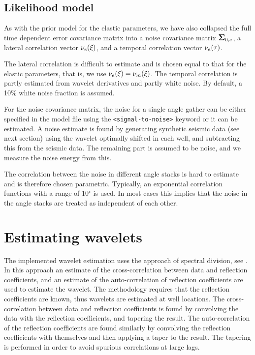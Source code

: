 \subsection{Likelihood model}

As with the prior model for the elastic parameters, we have also
collapsed the full time dependent error covariance matrix into a noise
covariance matrix $\mbox{\large\ensuremath{\boldsymbol{\Sigma}}}_{0,e}$, a lateral correlation vector
$\nu_e(\xi)$, and a temporal correlation vector $\nu_e(\tau)$.

The lateral correlation is difficult to estimate and is chosen equal
to that for the elastic parameters, that is, we use $\nu_e(\xi) =
\nu_m(\xi)$. The temporal correlation is partly estimated from wavelet
derivatives and partly white noise. By default, a 10\% white noise
fraction is assumed.

For the noise covariance matrix, the noise for a single angle gather
can be either specified in the model file using the
\texttt{<signal-to-noise>} keyword or it can be estimated. A noise
estimate is found by generating synthetic seismic data (see next
section) using the wavelet optimally shifted in each well, and
subtracting this from the seismic data. The remaining part is assumed
to be noise, and we measure the noise energy from this.

The correlation between the noise in different angle stacks is hard to
estimate and is therefore chosen parametric. Typically, an
exponential correlation functions with a range of 10$^\circ$ is
used. In most cases this implies that the noise in the angle stacks
are treated as independent of each other.

\section{Estimating wavelets}
\label{sec:waveestimp}
The implemented wavelet estimation uses the approach of spectral division, see \cite{White84}. 
In this approach an estimate of the cross-correlation between data  
and reflection coefficients, and an estimate of the auto-correlation of reflection coefficients
are used to estimate the wavelet. The methodology requires that the reflection 
coefficients are known,  thus wavelets are estimated at well locations. 
The cross-correlation between data
and reflection coefficients is found by convolving the data with the reflection coefficients, 
and tapering the result. The auto-correlation of the reflection coefficients 
are found similarly by convolving the reflection coefficients with themselves 
and then applying a taper to the result. The tapering is 
performed in order to avoid spurious correlations at large lags.  

